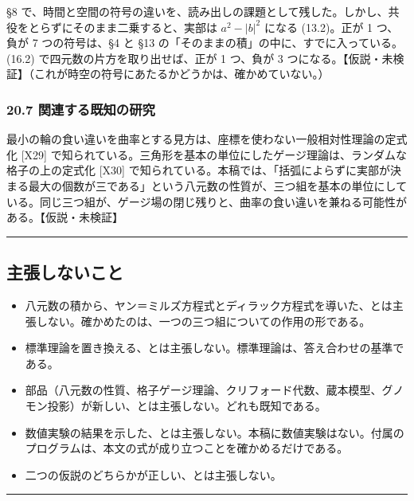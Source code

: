 \documentclass[
  a4paper,
]{ltjsarticle}
\providecommand{\tightlist}{%
  \setlength{\itemsep}{0pt}\setlength{\parskip}{0pt}}
\begin{document}
§8
で、時間と空間の符号の違いを、読み出しの課題として残した。しかし、共役をとらずにそのまま二乗すると、実部は
\(a^2 - \lvert b\rvert^2\) になる (13.2)。正が 1 つ、負が 7
つの符号は、§4 と §13 の「そのままの積」の中に、すでに入っている。(16.2)
で四元数の片方を取り出せば、正が 1 つ、負が 3
つになる。【仮説・未検証】（これが時空の符号にあたるかどうかは、確かめていない。）

\subsubsection{20.7
関連する既知の研究}\label{ux95a2ux9023ux3059ux308bux65e2ux77e5ux306eux7814ux7a76}

最小の輪の食い違いを曲率とする見方は、座標を使わない一般相対性理論の定式化
{[}X29{]}
で知られている。三角形を基本の単位にしたゲージ理論は、ランダムな格子の上の定式化
{[}X30{]}
で知られている。本稿では、「括弧によらずに実部が決まる最大の個数が三である」という八元数の性質が、三つ組を基本の単位にしている。同じ三つ組が、ゲージ場の閉じ残りと、曲率の食い違いを兼ねる可能性がある。【仮説・未検証】

\begin{center}\rule{0.5\linewidth}{0.5pt}\end{center}

\subsection{主張しないこと}\label{ux4e3bux5f35ux3057ux306aux3044ux3053ux3068}

\begin{itemize}
\tightlist
\item
  八元数の積から、ヤン＝ミルズ方程式とディラック方程式を導いた、とは主張しない。確かめたのは、一つの三つ組についての作用の形である。
\item
  標準理論を置き換える、とは主張しない。標準理論は、答え合わせの基準である。
\item
  部品（八元数の性質、格子ゲージ理論、クリフォード代数、蔵本模型、グノモン投影）が新しい、とは主張しない。どれも既知である。
\item
  数値実験の結果を示した、とは主張しない。本稿に数値実験はない。付属のプログラムは、本文の式が成り立つことを確かめるだけである。
\item
  二つの仮説のどちらかが正しい、とは主張しない。
\end{itemize}

\begin{center}\rule{0.5\linewidth}{0.5pt}\end{center}
\end{document}
